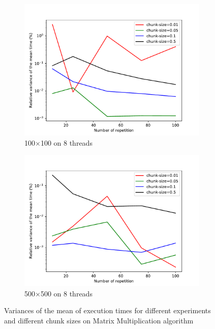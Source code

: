 \begin{figure}
\begin{subfigure}[b]{0.475\textwidth}
		\centering 
		\includegraphics[width=\textwidth]{images/relvar_100_8.pdf}
		\caption[]%
		{{\small 100$\times$100 on 8 threads}}    
	\end{subfigure}
	\quad
	\begin{subfigure}[b]{0.475\textwidth}   
		\centering 
		\includegraphics[width=\textwidth]{images/relvar_500_8.pdf}
		\caption[]%
		{{\small 500$\times$500 on 8 threads}}    
\end{subfigure}
	\caption[Standard deviations]
	{\small Variances of the mean of execution times for different experiments  and different chunk sizes on Matrix Multiplication algorithm} 

\end{figure}
